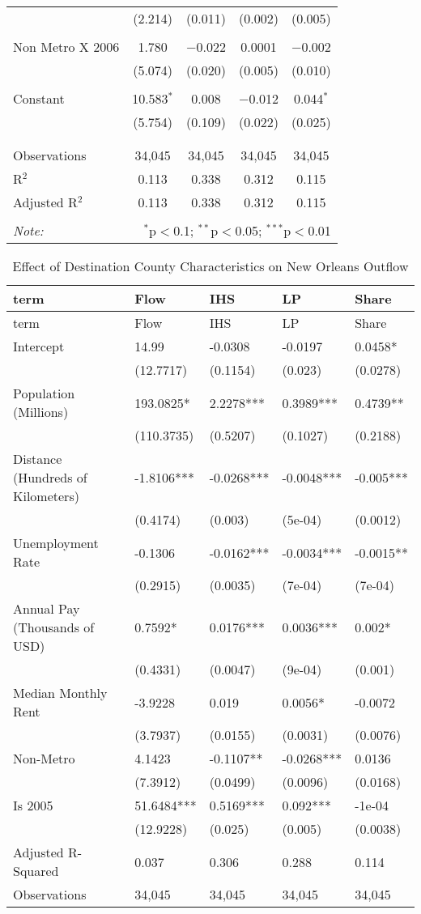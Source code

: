 \documentclass[]{article}
\begin{document}
\begin{table}[!htbp]
\begin{tabular}{@{\extracolsep{5pt}}lcccc}
  & (2.214) & (0.011) & (0.002) & (0.005) \\ 
  & & & & \\ 
 Non Metro X 2006 & 1.780 & $-$0.022 & 0.0001 & $-$0.002 \\ 
  & (5.074) & (0.020) & (0.005) & (0.010) \\ 
  & & & & \\ 
 Constant & 10.583$^{*}$ & 0.008 & $-$0.012 & 0.044$^{*}$ \\ 
  & (5.754) & (0.109) & (0.022) & (0.025) \\ 
  & & & & \\ 
\hline \\[-1.8ex] 
Observations & 34,045 & 34,045 & 34,045 & 34,045 \\ 
R$^{2}$ & 0.113 & 0.338 & 0.312 & 0.115 \\ 
Adjusted R$^{2}$ & 0.113 & 0.338 & 0.312 & 0.115 \\ 
\hline 
\hline \\[-1.8ex] 
\textit{Note:}  & \multicolumn{4}{r}{$^{*}$p$<$0.1; $^{**}$p$<$0.05; $^{***}$p$<$0.01} \\ 
\end{tabular} 
\end{table}

\clearpage

\begin{longtable}[]{@{}lllll@{}}
\caption{\label{tab:reg_main}Effect of Destination County
Characteristics on New Orleans Outflow}\tabularnewline
\toprule
term & Flow & IHS & LP & Share\tabularnewline
\midrule
\endfirsthead
\toprule
term & Flow & IHS & LP & Share\tabularnewline
\midrule
\endhead
Intercept & 14.99 & -0.0308 & -0.0197 & 0.0458*\tabularnewline
& (12.7717) & (0.1154) & (0.023) & (0.0278)\tabularnewline
Population (Millions) & 193.0825* & 2.2278*** & 0.3989*** &
0.4739**\tabularnewline
& (110.3735) & (0.5207) & (0.1027) & (0.2188)\tabularnewline
Distance (Hundreds of Kilometers) & -1.8106*** & -0.0268*** & -0.0048***
& -0.005***\tabularnewline
& (0.4174) & (0.003) & (5e-04) & (0.0012)\tabularnewline
Unemployment Rate & -0.1306 & -0.0162*** & -0.0034*** &
-0.0015**\tabularnewline
& (0.2915) & (0.0035) & (7e-04) & (7e-04)\tabularnewline
Annual Pay (Thousands of USD) & 0.7592* & 0.0176*** & 0.0036*** &
0.002*\tabularnewline
& (0.4331) & (0.0047) & (9e-04) & (0.001)\tabularnewline
Median Monthly Rent & -3.9228 & 0.019 & 0.0056* & -0.0072\tabularnewline
& (3.7937) & (0.0155) & (0.0031) & (0.0076)\tabularnewline
Non-Metro & 4.1423 & -0.1107** & -0.0268*** & 0.0136\tabularnewline
& (7.3912) & (0.0499) & (0.0096) & (0.0168)\tabularnewline
Is 2005 & 51.6484*** & 0.5169*** & 0.092*** & -1e-04\tabularnewline
& (12.9228) & (0.025) & (0.005) & (0.0038)\tabularnewline
Adjusted R-Squared & 0.037 & 0.306 & 0.288 & 0.114\tabularnewline
Observations & 34,045 & 34,045 & 34,045 & 34,045\tabularnewline
\bottomrule
\end{longtable}
\end{document}
